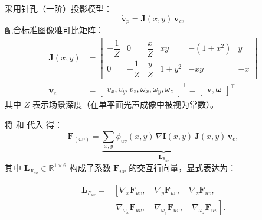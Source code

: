\documentclass{article}
\begin{document}
采用针孔（一阶）投影模型：
\begin{equation}
\dot{\mathbf{v}}_p = \mathbf{J}(x,y) \, \mathbf{v}_c,
\label{eq:Jpixel}
\end{equation}
配合标准图像雅可比矩阵：
\begin{equation}
\begin{aligned}
\mathbf{J}(x,y) &=
\begin{bmatrix}
-\dfrac{1}{Z} & 0 & \dfrac{x}{Z} & xy & -(1+x^{2}) & y \\
0 & -\dfrac{1}{Z} & \dfrac{y}{Z} & 1+y^{2} & -xy & -x
\end{bmatrix} \\[1em]
\mathbf{v}_c &=
\begin{bmatrix}
v_x, v_y, v_z, \omega_x, \omega_y, \omega_z
\end{bmatrix}^\top = \begin{bmatrix} \mathbf{v}, \boldsymbol{\omega} \end{bmatrix}^\top
\end{aligned}
\label{eq:image_jacobian}
\end{equation}
其中 $Z$ 表示场景深度（在单平面光声成像中被视为常数）。

将  和  代入  得：
\begin{equation}
\dot{\boldsymbol{F}}_{(uv)} 
= \underbrace{\sum_{x,y} \phi_{uv}(x,y) \, \nabla \boldsymbol{I}(x,y) \, \mathbf{J}(x,y)}_{\boldsymbol{L}_{\boldsymbol{F}_{uv}}} \, \mathbf{v}_c,
\label{eq:LFuv}
\end{equation}
    其中 $\boldsymbol{L}_{F_{uv}} \in \mathbb{R}^{1 \times 6}$ 构成了系数 $\boldsymbol{F}_{uv}$ 的交互行向量，显式表达为：

\begin{equation} \label{eq:LFuv_explicit}
\begin{aligned}
	\boldsymbol{L}_{F_{uv}} = 
	&\left[
		\nabla_x \boldsymbol{F}_{uv}, \quad 
		\nabla_y \boldsymbol{F}_{uv}, \quad  
		\nabla_z \boldsymbol{F}_{uv}, \right. \\
	&\left.\;
		\nabla_{\omega_x} \boldsymbol{F}_{uv}, \quad  
		\nabla_{\omega_y} \boldsymbol{F}_{uv}, \quad  
		\nabla_{\omega_z} \boldsymbol{F}_{uv}
	\right].
\end{aligned}
\end{equation}
\end{document}
